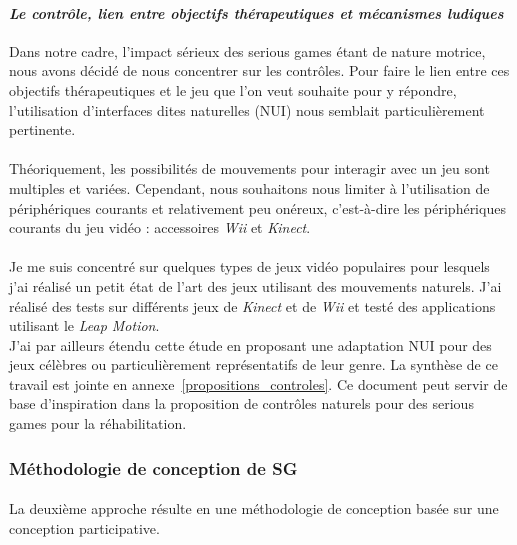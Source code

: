 			\paragraph{\emph{Le contrôle, lien entre objectifs thérapeutiques et mécanismes ludiques}\\}
Dans notre cadre, l'impact sérieux des serious games étant de nature motrice, nous avons décidé de nous concentrer sur les contrôles. Pour faire le lien entre ces objectifs thérapeutiques et le jeu que l’on veut souhaite pour y répondre, l’utilisation d’interfaces dites naturelles (NUI) nous semblait particulièrement pertinente. 

\paragraph{} 
Théoriquement, les possibilités de mouvements pour interagir avec un jeu sont multiples et variées. Cependant, nous souhaitons nous limiter à l'utilisation de périphériques courants et relativement peu onéreux, c'est-à-dire les périphériques courants du jeu vidéo : accessoires \emph{Wii} et \emph{Kinect}.

\paragraph{} Je me suis concentré sur quelques types de jeux vidéo populaires pour lesquels j'ai réalisé un petit état de l'art des jeux utilisant des mouvements naturels. J'ai réalisé des tests sur différents jeux de \emph{Kinect} et de \emph{Wii} et testé des applications utilisant le \emph{Leap Motion}. \\J'ai par ailleurs étendu cette étude en proposant une adaptation NUI pour des jeux célèbres ou particulièrement représentatifs de leur genre.
La synthèse de ce travail est jointe en annexe~\ref{propositions_controles}. Ce document peut servir de base d'inspiration dans la proposition de contrôles naturels pour des serious games pour la réhabilitation.

	
	\subsubsection{Méthodologie de conception de SG}
	\paragraph{}
La deuxième approche résulte en une méthodologie de conception basée sur une conception participative. 

